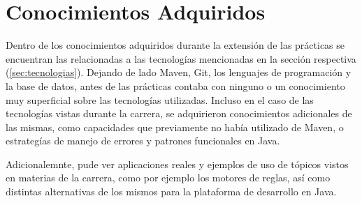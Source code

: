 \section{Conocimientos Adquiridos}
Dentro de los conocimientos adquiridos durante la extensión de las prácticas se encuentran las relacionadas a las tecnologías mencionadas en la sección respectiva (\cref{sec:tecnologias}). Dejando de lado Maven, Git, los lenguajes de programación y la base de datos, antes de las prácticas contaba con ninguno o un conocimiento muy superficial sobre las tecnologías utilizadas. Incluso en el caso de las tecnologías vistas durante la carrera, se adquirieron conocimientos adicionales de las mismas, como capacidades que previamente no había utilizado de Maven, o estrategías de manejo de errores y patrones funcionales en Java.

Adicionalemnte, pude ver aplicaciones reales y ejemplos de uso de tópicos vistos en materias de la carrera, como por ejemplo los motores de reglas, así como distintas alternativas de los mismos para la plataforma de desarrollo en Java.
